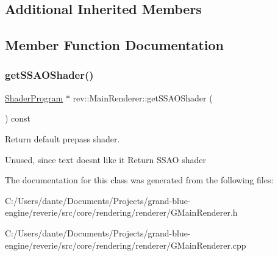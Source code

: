 \subsection*{Additional Inherited Members}


\subsection{Member Function Documentation}
\mbox{\label{classrev_1_1_main_renderer_a230ccdf12b276471661c9be6ebcb6ef6}} 
\subsubsection{\texorpdfstring{getSSAOShader()}{getSSAOShader()}}
{\footnotesize\ttfamily \mbox{\hyperlink{classrev_1_1_shader_program}{Shader\+Program}} $\ast$ rev\+::\+Main\+Renderer\+::get\+S\+S\+A\+O\+Shader (\begin{DoxyParamCaption}{ }\end{DoxyParamCaption}) const}



Return default prepass shader. 

Unused, since text doesn\textquotesingle{}t like it Return S\+S\+AO shader 

The documentation for this class was generated from the following files\+:\begin{DoxyCompactItemize}
\item 
C\+:/\+Users/dante/\+Documents/\+Projects/grand-\/blue-\/engine/reverie/src/core/rendering/renderer/G\+Main\+Renderer.\+h\item 
C\+:/\+Users/dante/\+Documents/\+Projects/grand-\/blue-\/engine/reverie/src/core/rendering/renderer/G\+Main\+Renderer.\+cpp\end{DoxyCompactItemize}
